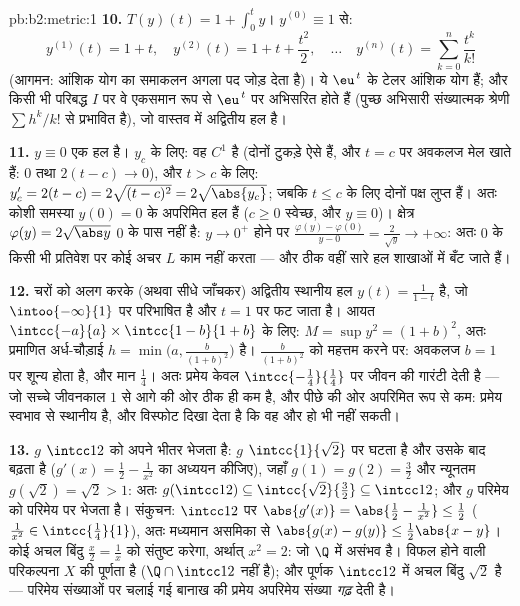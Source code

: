 \begin{solution}{pb:b2:metric:1}
\textbf{10.} $T(y)(t) = 1 + \int_0^t y$। $y^{(0)} \equiv
1$ से:
\[
y^{(1)}(t) = 1 + t,\quad
y^{(2)}(t) = 1 + t + \frac{t^2}2,\quad\dots\quad
y^{(n)}(t) = \sum_{k=0}^{n}\frac{t^k}{k!}
\]
(आगमन: आंशिक योग का समाकलन अगला पद जोड़ देता है)। ये $\eu^{\,t}$ के टेलर आंशिक
योग हैं; और किसी भी परिबद्ध $I$ पर वे एकसमान रूप से $\eu^{\,t}$ पर अभिसरित होते
हैं (पुच्छ अभिसारी संख्यात्मक श्रेणी $\sum h^k/k!$ से प्रभावित है), जो वास्तव में
अद्वितीय हल है।

\textbf{11.} $y \equiv 0$ एक हल है। $y_c$ के लिए: वह $C^1$ है (दोनों टुकड़े ऐसे हैं,
और $t = c$ पर अवकलज मेल खाते हैं: $0$ तथा $2(t - c) \to 0$), और $t > c$ के लिए: $y_c' = 2(t - c) =
2\sqrt{(t-c)^2} = 2\sqrt{\abs{y_c}}$; जबकि
$t \leq c$ के लिए दोनों पक्ष लुप्त हैं। अतः कोशी समस्या $y(0) = 0$ के अपरिमित हल हैं
($c \geq 0$ स्वेच्छ, और $y \equiv 0$)। क्षेत्र $\varphi(y) = 2\sqrt{\abs y}$ $0$ के पास  नहीं है:
$y \to 0^+$ होने पर $\frac{\varphi(y) - \varphi(0)}{y - 0} = \frac{2}{\sqrt y} \to
+\infty$: अतः $0$ के किसी भी प्रतिवेश पर कोई अचर $L$ काम
नहीं करता --- और ठीक वहीं सारे हल शाखाओं में बँट जाते हैं।

\textbf{12.} चरों को अलग करके (अथवा सीधे जाँचकर) अद्वितीय स्थानीय हल
$y(t) = \frac1{1 - t}$ है, जो $\intoo{-\infty}{1}$ पर परिभाषित है और $t = 1$ पर फट जाता है। आयत $\intcc{-a}{a} \times \intcc{1 - b}{1 + b}$ के लिए:
$M =
\sup y^2 = (1 + b)^2$, अतः प्रमाणित अर्ध-चौड़ाई $h =
\min\bigl(a, \frac{b}{(1+b)^2}\bigr)$ है। $\frac{b}{(1+b)^2}$ को महत्तम करने पर: अवकलज $b = 1$
पर शून्य होता है, और मान $\frac14$। अतः प्रमेय केवल $\intcc{-\frac14}{\frac14}$ पर जीवन की गारंटी
देती है --- जो सच्चे जीवनकाल $1$ से आगे की ओर ठीक ही कम है, और पीछे
की ओर अपरिमित रूप से कम: प्रमेय स्वभाव से स्थानीय है, और विस्फोट दिखा
देता है कि वह और हो भी नहीं सकती।

\textbf{13.} $g$ $\intcc12$ को अपने भीतर भेजता है: $g$ $\intcc{1}{\sqrt2}$ पर घटता है और उसके
बाद बढ़ता है ($g'(x) = \frac12
- \frac1{x^2}$ का अध्ययन कीजिए), जहाँ $g(1) = g(2) = \frac32$ और न्यूनतम $g(\sqrt2) = \sqrt2 > 1$: अतः $g(\intcc12) \subseteq
\intcc{\sqrt2}{\frac32} \subseteq \intcc12$;
और $g$ परिमेय को परिमेय पर भेजता है। संकुचन: $\intcc12$ पर $\abs{g'(x)} = \abs{\frac12
- \frac1{x^2}} \leq \frac12$ ($\frac1{x^2} \in
\intcc{\frac14}{1}$), अतः
मध्यमान असमिका से $\abs{g(x) - g(y)} \leq \frac12\abs{x - y}$। कोई अचल बिंदु $\frac x2 = \frac1x$ को संतुष्ट करेगा, अर्थात्
$x^2 = 2$: जो $\Q$ में असंभव है। विफल होने वाली परिकल्पना $X$ की पूर्णता
है ($\Q \cap
\intcc12$  नहीं है); और पूर्णक $\intcc12$ में अचल बिंदु $\sqrt2$ है ---
परिमेय संख्याओं पर चलाई गई बानाख की प्रमेय अपरिमेय संख्या \emph{गढ़}
देती है।


\end{solution}
